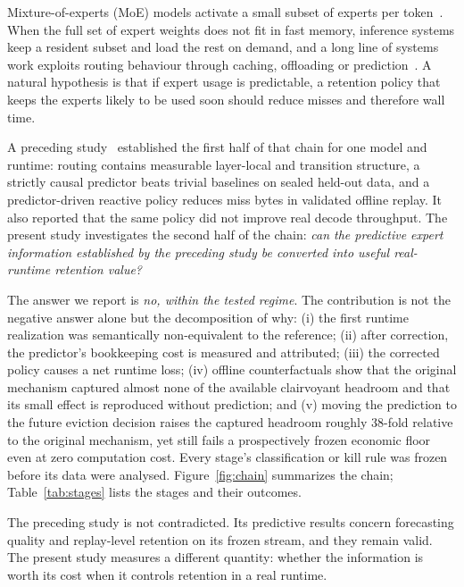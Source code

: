 \documentclass[11pt]{article}
\theoremstyle{plain}
\theoremstyle{definition}
\begin{document}
Mixture-of-experts (MoE) models activate a small subset of experts per token~\cite{shazeer2017sparsely,fedus2022switch}. When the full set of expert weights does not fit in fast memory, inference systems keep a resident subset and load the rest on demand, and a long line of systems work exploits routing behaviour through caching, offloading or prediction~\cite{eliseev2023offloading,xue2025moeinfinity,kamahori2025fiddler,liu2026survey}. A natural hypothesis is that if expert usage is predictable, a retention policy that keeps the experts likely to be used soon should reduce misses and therefore wall time.

A preceding study~\cite{argine2paper} established the first half of that chain for one model and runtime: routing contains measurable layer-local and transition structure, a strictly causal predictor beats trivial baselines on sealed held-out data, and a predictor-driven reactive policy reduces miss bytes in validated offline replay. It also reported that the same policy did not improve real decode throughput. The present study investigates the second half of the chain: \emph{can the predictive expert information established by the preceding study be converted into useful real-runtime retention value?}

The answer we report is \emph{no, within the tested regime}. The contribution is not the negative answer alone but the decomposition of why: (i) the first runtime realization was semantically non-equivalent to the reference; (ii) after correction, the predictor's bookkeeping cost is measured and attributed; (iii) the corrected policy causes a net runtime loss; (iv) offline counterfactuals show that the original mechanism captured almost none of the available clairvoyant headroom and that its small effect is reproduced without prediction; and (v) moving the prediction to the future eviction decision raises the captured headroom roughly 38-fold relative to the original mechanism, yet still fails a prospectively frozen economic floor even at zero computation cost. Every stage's classification or kill rule was frozen before its data were analysed. Figure~\ref{fig:chain} summarizes the chain; Table~\ref{tab:stages} lists the stages and their outcomes.

The preceding study is not contradicted. Its predictive results concern forecasting quality and replay-level retention on its frozen stream, and they remain valid. The present study measures a different quantity: whether the information is worth its cost when it controls retention in a real runtime.
\end{document}
